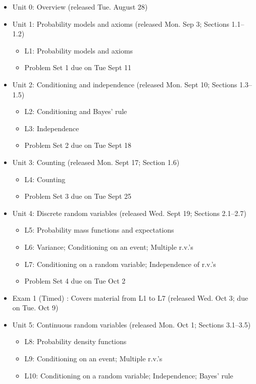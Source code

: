 \documentclass[pdftex, brazil, 12pt, twoside]{article}
\begin{document}
\begin{itemize}[noitemsep]
\item Unit 0: Overview (released Tue. August 28)
\item Unit 1: Probability models and axioms (released Mon. Sep 3; Sections 1.1--1.2)
  \begin{itemize}[noitemsep]
  \item L1: Probability models and axioms
  \item Problem Set 1 due on Tue Sept 11
  \end{itemize}
\item Unit 2: Conditioning and independence (released Mon. Sept 10; Sections 1.3--1.5)
  \begin{itemize}[noitemsep]
  \item L2: Conditioning and Bayes' rule
  \item L3: Independence
  \item Problem Set 2 due on Tue Sept 18
  \end{itemize}
\item Unit 3: Counting (released Mon. Sept 17; Section 1.6)
  \begin{itemize}[noitemsep]
  \item L4: Counting
  \item Problem Set 3 due on Tue Sept 25
  \end{itemize}
\item Unit 4: Discrete random variables (released Wed. Sept 19; Sections 2.1--2.7)
  \begin{itemize}[noitemsep]
  \item L5: Probability mass functions and expectations
  \item L6: Variance; Conditioning on an event; Multiple r.v.'s
  \item L7: Conditioning on a random variable; Independence of r.v.'s
  \item Problem Set 4 due on Tue Oct 2
  \end{itemize}
\item Exam 1 (Timed) : Covers material from L1 to L7 (released Wed. Oct 3; due on Tue. Oct 9)
\item Unit 5: Continuous random variables (released Mon. Oct 1; Sections 3.1--3.5)
  \begin{itemize}[noitemsep]
  \item L8: Probability density functions
  \item L9: Conditioning on an event; Multiple r.v.'s
  \item L10: Conditioning on a random variable; Independence; Bayes' rule

\end{itemize}
\end{itemize}
\end{document}
